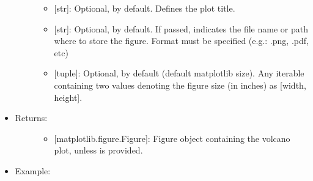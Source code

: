 \documentclass[letterpaper,10pt,english]{sphinxmanual}
\begin{document}
\begin{fulllineitems}
\begin{itemize}
\begin{description}
\begin{itemize}
\item {} 
 {[}str{]}: Optional,  by default. Defines the plot
title.

\item {} 
 {[}str{]}: Optional,  by default. If passed,
indicates the file name or path where to store the figure.
Format must be specified (e.g.: .png, .pdf, etc)

\item {} 
 {[}tuple{]}: Optional,  by default (default
matplotlib size). Any iterable containing two values denoting
the figure size (in inches) as {[}width, height{]}.

\end{itemize}

\end{description}

\item {} \begin{description}
\item[{Returns:}] \leavevmode\begin{itemize}
\item {} 
{[}matplotlib.figure.Figure{]}: Figure object containing the
volcano plot, unless  is provided.

\end{itemize}

\end{description}

\item {} \begin{description}
\item[{Example:}] \leavevmode
\begin{sphinxVerbatim}[commandchars=\\\{\}]
 
\end{sphinxVerbatim}


\end{description}

\end{itemize}

\end{fulllineitems}
\end{document}
